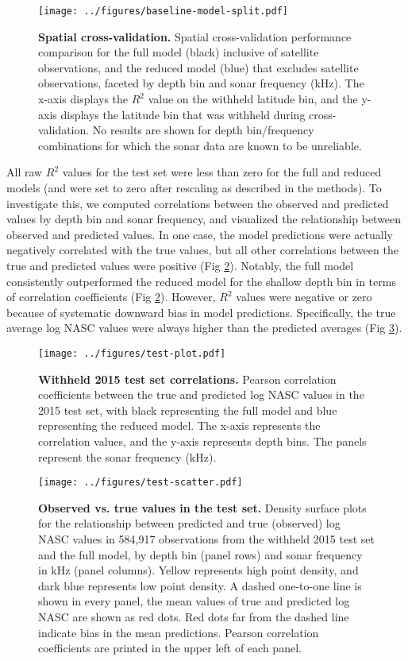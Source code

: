 \documentclass[10pt,letterpaper]{article}
\begin{document}
\begin{figure}[ht]
    \centering
    \texttt{[image: ../figures/baseline-model-split.pdf]}
    \caption{{\bf Spatial cross-validation.} Spatial cross-validation performance comparison for the full model (black) inclusive of satellite observations, and the reduced model (blue) that excludes satellite observations, faceted by depth bin and sonar frequency (kHz). The x-axis displays the $R^2$ value on the withheld latitude bin, and the y-axis displays the latitude bin that was withheld during cross-validation. No results are shown for depth bin/frequency combinations for which the sonar data are known to be unreliable.}
    \label{fig:fig3}
\end{figure}

All raw $R^2$ values for the test set were less than zero for the full and reduced models (and were set to zero after rescaling as described in the methods).
To investigate this, we computed correlations between the observed and predicted values by depth bin and sonar frequency, and visualized the relationship between observed and predicted values.
In one case, the model predictions were actually negatively correlated with the true values, but all other correlations between the true and predicted values were positive (Fig \ref{fig:fig4}).
Notably, the full model consistently outperformed the reduced model for the shallow depth bin in terms of correlation coefficients (Fig \ref{fig:fig4}).
However, $R^2$ values were negative or zero because of systematic downward bias in model predictions.
Specifically, the true average log NASC values were always higher than the predicted averages (Fig \ref{fig:fig5}).

\begin{figure}[ht]
    \centering
    \texttt{[image: ../figures/test-plot.pdf]}
    \caption{{\bf Withheld 2015 test set correlations.} Pearson correlation coefficients between the true and predicted log NASC values in the 2015 test set, with black representing the full model and blue representing the reduced model. The x-axis represents the correlation values, and the y-axis represents depth bins. The panels represent the sonar frequency (kHz).}
    \label{fig:fig4}
\end{figure}

\begin{figure}[ht]
    \centering
    \texttt{[image: ../figures/test-scatter.pdf]}
    \caption{{\bf Observed vs. true values in the test set.} Density surface plots for the relationship between predicted and true (observed) log NASC values in 584,917 observations from the withheld 2015 test set and the full model, by depth bin (panel rows) and sonar frequency in kHz (panel columns). Yellow represents high point density, and dark blue represents low point density. A dashed one-to-one line is shown in every panel, the mean values of true and predicted log NASC are shown as red dots. Red dots far from the dashed line indicate bias in the mean predictions. Pearson correlation coefficients are printed in the upper left of each panel.}
    \label{fig:fig5}
\end{figure}
\end{document}
